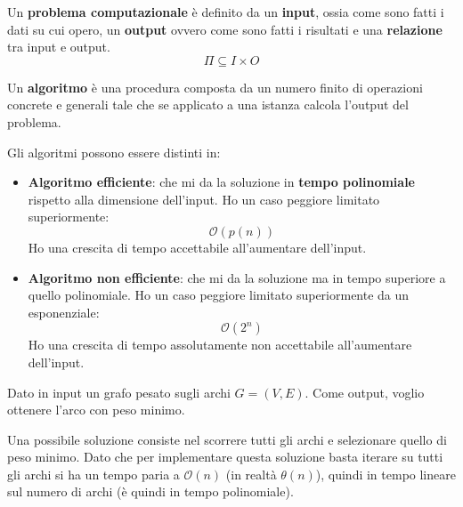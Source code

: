 \begin{definizione}
    Un \textbf{problema computazionale} è definito da un \textbf{input}, ossia
    come sono fatti i dati su cui opero, un \textbf{output} ovvero come sono fatti
    i risultati e una \textbf{relazione} tra input e output.
    \begin{equation}
        \Pi \subseteq I \times O
    \end{equation}
\end{definizione}
\begin{definizione} 
    Un \textbf{algoritmo} è una procedura composta da un numero finito di operazioni
    concrete e generali tale che se applicato a una istanza calcola l'output del problema.

    Gli algoritmi possono essere distinti in:
    \begin{itemize}
        \item \textbf{Algoritmo efficiente}: che mi da la soluzione in \textbf{tempo polinomiale}
              rispetto alla dimensione dell'input. Ho un caso peggiore limitato superiormente:
              \begin{equation}
                  \mathcal{O}(p(n))
              \end{equation}
              Ho una crescita di tempo accettabile all'aumentare dell'input.
        \item \textbf{Algoritmo non efficiente}: che mi da la soluzione ma in
              tempo superiore a quello polinomiale. Ho un caso peggiore limitato
              superiormente da un esponenziale:
              \begin{equation}
                  \mathcal{O}(2^n)
              \end{equation}
              Ho una crescita di tempo assolutamente non accettabile all'aumentare dell'input.
    \end{itemize}
\end{definizione}
\begin{esempio} 
    Dato in input un grafo pesato sugli archi $G = (V,E)$. Come output, voglio
    ottenere l'arco con peso minimo.

    Una possibile soluzione consiste nel scorrere tutti gli archi e selezionare
    quello di peso minimo. Dato che per implementare questa soluzione basta iterare
    su tutti gli archi si ha un tempo paria a $\mathcal{O}(n)$ (in realtà $\theta(n)$),
    quindi in tempo lineare sul numero di archi (è quindi in tempo polinomiale).
\end{esempio}
